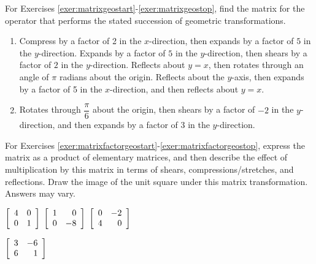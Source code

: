 
\noindent For Exercises \ref{exer:matrixgeostart}-\ref{exer:matrixgeostop}, find the matrix for the operator that performs the stated succession of geometric transformations.
\begin{enumerate}[!HW!, start=1, label=$\spadesuit$ \arabic*., ref=\arabic*]
\item\label{exer:matrixgeostart} Compress by a factor of 2 in the $x$-direction, then expands by a factor of $5$ in the $y$-direction. %
\itemspade Expands by a factor of $5$ in the $y$-direction, then shears by a factor of $2$ in the $y$-direction.%
\itemspade Reflects about $y=x$, then rotates through an angle of $\pi$ radians about the origin.%
\itemspade Reflects about the $y$-axis, then expands by a factor of 5 in the $x$-direction, and then reflects about $y=x$.%
\item\label{exer:matrixgeostop} Rotates through $\dfrac{\pi}{6}$ about the origin, then shears by a factor of $-2$ in the $y$-direction, and then expands by a factor of 3 in the $y$-direction.%
\end{enumerate}

\noindent For Exercises \ref{exer:matrixfactorgeostart}-\ref{exer:matrixfactorgeostop}, express the matrix as a product of elementary matrices, and then describe the effect of multiplication by this matrix in terms of shears, compressions/stretches, and reflections. Draw the image of the unit square under this matrix transformation. Answers may vary.
\begin{enumerate}[!HW!, label=$\spadesuit$ \arabic*., ref=\arabic*]
\begin{multicols}{4}
\item\label{exer:matrixfactorgeostart} $\mtx{rr}{4&0\\0&1}$ %
\itemspade $\mtx{rr}{1&0\\0&-8}$%
\itemspade $\mtx{rr}{0&-2\\4&0}$%
\item\label{exer:matrixfactorgeostop} $\mtx{rr}{3&-6\\6&1}$%
\end{multicols}
\end{enumerate}

